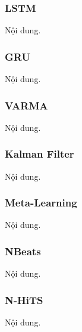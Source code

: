 \subsubsection{LSTM}
Nội dung.



\subsubsection{GRU}
Nội dung.




\subsubsection{VARMA}
Nội dung.




\subsubsection{Kalman Filter}
Nội dung.





\subsubsection{Meta-Learning}
Nội dung.





\subsubsection{NBeats}
Nội dung.




\subsubsection{N-HiTS}
Nội dung.

